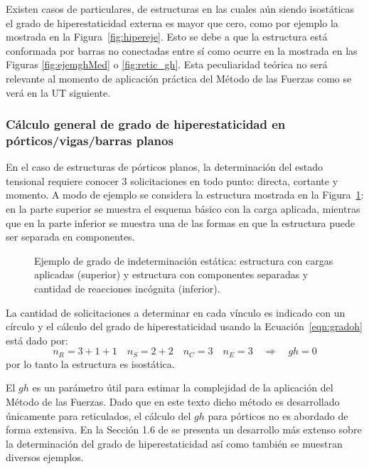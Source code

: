 {\cambio 
Existen casos de particulares, de estructuras en las cuales aún siendo isostáticas el grado de hiperestaticidad externa es mayor que cero, como por ejemplo la mostrada en la Figura~\ref{fig:hipereje}. %
%
Esto se debe a que la estructura está conformada por barras no conectadas entre sí como ocurre en la mostrada en las Figuras \ref{fig:ejemghMed} o \ref{fig:retic_gh}. %
%
Esta peculiaridad teórica no será relevante al momento de aplicación práctica del Método de las Fuerzas como se verá en la UT siguiente.
}

\subsubsection{Cálculo general de grado de hiperestaticidad en pórticos/vigas/barras planos}

En el caso de estructuras de pórticos planos, la determinación del estado tensional requiere conocer 3 solicitaciones en todo punto: directa, cortante y momento. %
%
A modo de ejemplo se considera la estructura mostrada en la Figura~\ref{fig:gerb}: en la parte superior se muestra el esquema básico con la carga aplicada, mientras que en la parte inferior se muestra una de las formas en que la estructura puede ser separada en componentes. 
%
\begin{figure}[htb]
	\centering
	\def\svgwidth{0.7\textwidth}
	
	\caption{Ejemplo de grado de indeterminación estática: estructura con cargas aplicadas (superior) y estructura con componentes separadas y cantidad de reacciones incógnita (inferior).}
	\label{fig:gerb}
\end{figure}

La cantidad de solicitaciones a determinar en cada vínculo es indicado con un círculo y el cálculo del grado de hiperestaticidad usando la Ecuación~\eqref{eqn:gradoh} está dado por:
%
\begin{equation}
n_R = 3+1+1 \quad n_S = 2+2 \quad n_C = 3 \quad n_E = 3 \quad \Rightarrow \quad gh = 0
\end{equation}
%
por lo tanto la estructura es isostática.

El $gh$ es un parámetro útil para estimar la complejidad de la aplicación del Método de las Fuerzas. %
%
Dado que en este texto dicho método es desarrollado únicamente para reticulados, el cálculo del $gh$ para pórticos no es abordado de forma extensiva. %
%
En la Sección 1.6 de \citep{CerveraRuiz2002ii} se presenta un desarrollo más extenso sobre la determinación del grado de hiperestaticidad así como también se muestran diversos ejemplos.


